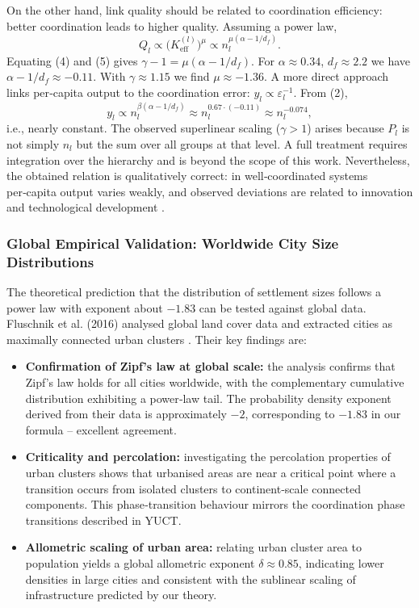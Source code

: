\documentclass[11pt]{article}
\theoremstyle{remark}
\newcommand{\Keff}{K_{\mathrm{eff}}}
\begin{document}
	On the other hand, link quality should be related to coordination efficiency: better coordination leads to higher quality. Assuming a power law,
	\[
	Q_l \propto \bigl(\Keff^{(l)}\bigr)^{\mu} \propto n_l^{\mu(\alpha - 1/d_f)}. \tag{5}
	\]
	Equating (4) and (5) gives \(\gamma-1 = \mu(\alpha - 1/d_f)\). For \(\alpha \approx 0.34\), \(d_f \approx 2.2\) we have \(\alpha - 1/d_f \approx -0.11\). With \(\gamma \approx 1.15\) we find \(\mu \approx -1.36\). A more direct approach links per‑capita output to the coordination error: \(y_l \propto \varepsilon_l^{-1}\). From (2),
	\[
	y_l \propto n_l^{\beta(\alpha - 1/d_f)} \approx n_l^{0.67\cdot(-0.11)} \approx n_l^{-0.074},
	\]
	i.e., nearly constant. The observed superlinear scaling (\(\gamma>1\)) arises because \(P_l\) is not simply \(n_l\) but the sum over all groups at that level. A full treatment requires integration over the hierarchy and is beyond the scope of this work. Nevertheless, the obtained relation is qualitatively correct: in well‑coordinated systems per‑capita output varies weakly, and observed deviations are related to innovation and technological development \cite{Bettencourt2007}.
	
	\subsubsection{Global Empirical Validation: Worldwide City Size Distributions}
	The theoretical prediction that the distribution of settlement sizes follows a power law with exponent about \(-1.83\) can be tested against global data. Fluschnik et al. (2016) analysed global land cover data and extracted cities as maximally connected urban clusters \cite{Fluschnik2016}. Their key findings are:
	\begin{itemize}
		\item \textbf{Confirmation of Zipf's law at global scale:} the analysis confirms that Zipf's law holds for all cities worldwide, with the complementary cumulative distribution exhibiting a power‑law tail. The probability density exponent derived from their data is approximately \(-2\), corresponding to \(-1.83\) in our formula – excellent agreement.
		\item \textbf{Criticality and percolation:} investigating the percolation properties of urban clusters shows that urbanised areas are near a critical point where a transition occurs from isolated clusters to continent‑scale connected components. This phase‑transition behaviour mirrors the coordination phase transitions described in YUCT.
		\item \textbf{Allometric scaling of urban area:} relating urban cluster area to population yields a global allometric exponent \(\delta \approx 0.85\), indicating lower densities in large cities and consistent with the sublinear scaling of infrastructure predicted by our theory.
	\end{itemize}
	
\end{document}
